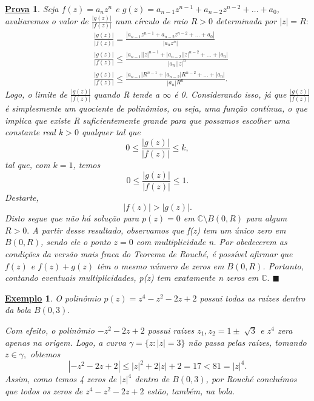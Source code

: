 \documentclass{article}
\newtheorem{example}{\underline{Exemplo}}[section]
\newtheorem*{proof*}{\underline{Prova}}
\renewcommand\qedsymbol{$\blacksquare$}
\begin{document}
  \begin{proof*}
    Seja \(f(z) = a_{n}z^{n}\) e \(g(z) = a_{n-1}z^{n-1}+a_{n-2}z^{n-2}+\dotsc +a_{0}\), avaliaremos o valor de \(\frac{|g(z)|}{|f(z)|}\) num círculo de raio \(R > 0\) determinada por \(|z| = R:\)
    \begin{align*}
    &\frac{|g(z)|}{|f(z)|} = \frac{|a_{n-1}z^{n-1} + a_{n-2}z^{n-2}+\dotsc +a_{0}|}{|a_{n}z^{n}|}\\
    &\frac{|g(z)|}{|f(z)|} \leq \frac{|a_{n-1}||z|^{n-1} + |a_{n-2}||z|^{n-2}+\dotsc +|a_{0}|}{|a_{n}||z|^{n}}\\
    &\frac{|g(z)|}{|f(z)|} \leq \frac{|a_{n-1}|R^{n-1}+|a_{n-2}|R^{n-2}+\dotsc +|a_{0}|}{|a_{n}|R^{n}}.
    \end{align*}
    Logo, o limite de \(\frac{|g(z)|}{|f(z)|}\) quando R tende a \(\infty\) é 0. Considerando isso, já que \(\frac{|g(z)|}{|f(z)|}\) é simplesmente um quociente de polinômios, ou seja,
    uma função contínua, o que implica que existe R suficientemente grande para que possamos escolher uma constante real \(k > 0\) qualquer tal que 
    \[
      0\leq \frac{|g(z)|}{|f(z)|}\leq k,
    \]
    tal que, com \(k=1\), temos 
    \[
      0 \leq \frac{|g(z)|}{|f(z)|}\leq 1.
    \]
    Destarte, 
    \[
      |f(z)| > |g(z)|.
    \]
    Disto segue que não há solução para \(p(z) = 0\) em \(\mathbb{C}\setminus{B(0, R)}\) para algum \(R > 0.\) A partir desse resultado, observamos que f(z) tem um único zero em \(B(0, R)\), sendo ele o ponto
    \(z=0\) com multiplicidade n. Por obedecerem as condições da versão mais fraca do Teorema de Rouché, é possível afirmar que \(f(z)\) e \(f(z) + g(z)\) têm o mesmo número de zeros em \(B(0, R)\). Portanto,
    contando eventuais multiplicidades, p(z) tem exatamente n zeros em \(\mathbb{C}.\) \qedsymbol
  \end{proof*}
  \begin{example}
    O polinômio \(p(z) = z^{4} - z^{2} - 2z + 2\) possui todas as raízes dentro da bola \(B(0, 3).\)

    Com efeito, o polinômio \(-z^{2} - 2z + 2\) possui raízes \(z_{1}, z_{2} = 1\pm \sqrt[]{3}\) e \(z^{4}\) zera apenas na origem. Logo, a curva \(\gamma  = \{z: |z| = 3\}\) não passa pelas raízes, tomando
    \(z\in \gamma ,\) obtemos 
    \[
      |-z^{2} - 2z + 2| \leq |z|^{2} + 2|z| + 2 = 17 < 81 = |z|^{4}.
    \]
    Assim, como temos 4 zeros de \(|z|^{4}\) dentro de \(B(0, 3)\), por Rouché concluímos que todos os zeros de \(z^{4}-z^{2}-2z + 2\) estão, também, na bola.
  \end{example} 
  \newpage
  
\end{document}
